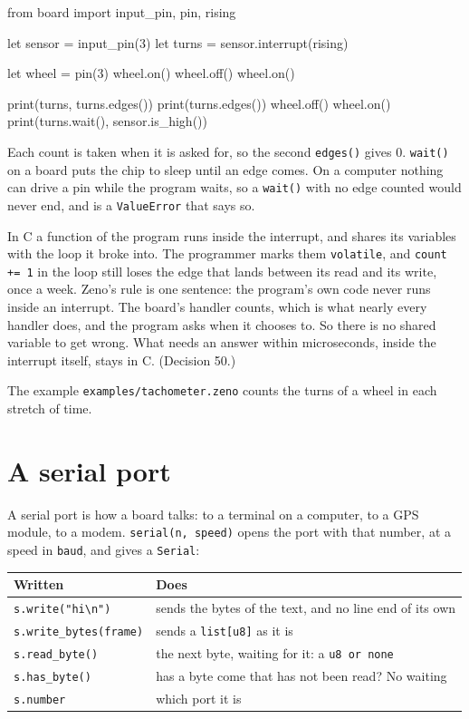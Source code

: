 \begin{zeno}
from board import input_pin, pin, rising

let sensor = input_pin(3)
let turns = sensor.interrupt(rising)

let wheel = pin(3)
wheel.on()
wheel.off()
wheel.on()

print(turns, turns.edges())
print(turns.edges())
wheel.off()
wheel.on()
print(turns.wait(), sensor.is_high())
\end{zeno}

Each count is taken when it is asked for, so the second
\verb|edges()| gives 0. \verb|wait()| on a board puts the chip to sleep
until an edge comes. On a computer nothing can drive a pin while the
program waits, so a \verb|wait()| with no edge counted would never
end, and is a \verb|ValueError| that says so.

\begin{why}
In C a function of the program runs inside the interrupt, and shares
its variables with the loop it broke into. The programmer marks them
\verb|volatile|, and \verb|count += 1| in the loop still loses the
edge that lands between its read and its write, once a week. Zeno's
rule is one sentence: the program's own code never runs inside an
interrupt. The board's handler counts, which is what nearly every
handler does, and the program asks when it chooses to. So there is no
shared variable to get wrong. What needs an answer within
microseconds, inside the interrupt itself, stays in C.
(Decision 50.)
\end{why}

The example \verb|examples/tachometer.zeno| counts the turns of a
wheel in each stretch of time.

\section{A serial port}

A serial port is how a board talks: to a terminal on a computer, to a
GPS module, to a modem. \verb|serial(n, speed)| opens the port with
that number, at a speed in \verb|baud|, and gives a \verb|Serial|:

\begin{center}
\begin{tabular}{ll}
\toprule
Written & Does \\
\midrule
\verb|s.write("hi\n")| & sends the bytes of the text, and no line end of its own \\
\verb|s.write_bytes(frame)| & sends a \verb|list[u8]| as it is \\
\verb|s.read_byte()| & the next byte, waiting for it: a \verb|u8 or none| \\
\verb|s.has_byte()| & has a byte come that has not been read? No waiting \\
\verb|s.number| & which port it is \\
\bottomrule
\end{tabular}
\end{center}

